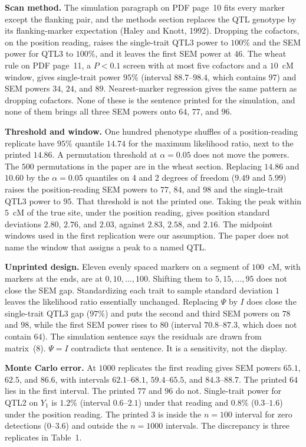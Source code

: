 \documentclass[11pt]{article}
\begin{document}
\textbf{Scan method.} The simulation paragraph on PDF page~10 fits every
marker except the flanking pair, and the methods section replaces the QTL
genotype by its flanking-marker expectation (Haley and Knott, 1992).
Dropping the cofactors, on the position reading, raises the single-trait QTL3
power to $100\%$ and the SEM power for QTL3 to $100\%$, and it leaves the
first SEM power at $46$. The wheat rule on PDF page~11, a $P<0.1$ screen
with at most five cofactors and a $10$~cM window, gives single-trait power
$95\%$ (interval $88.7$--$98.4$, which contains $97$) and SEM powers $34$,
$24$, and $89$. Nearest-marker regression gives the same pattern as dropping
cofactors. None of these is the sentence printed for the simulation, and
none of them brings all three SEM powers onto $64$, $77$, and $96$.

\textbf{Threshold and window.} One hundred phenotype shuffles of a position-reading
replicate have $95\%$ quantile $14.74$ for the maximum likelihood ratio,
next to the printed $14.86$. A permutation threshold at $\alpha=0.05$ does
not move the powers. The $500$ permutations in the paper are in the wheat
section. Replacing $14.86$ and $10.60$ by the $\alpha=0.05$ quantiles on 4
and 2 degrees of freedom ($9.49$ and $5.99$) raises the position-reading SEM
powers to $77$, $84$, and $98$ and the single-trait QTL3 power to $95$. That
threshold is not the printed one. Taking the peak within $5$~cM of the true
site, under the position reading, gives position standard deviations $2.80$,
$2.76$, and $2.03$, against $2.83$, $2.58$, and $2.16$. The midpoint windows
used in the first replication were our assumption. The paper does not name
the window that assigns a peak to a named QTL.

\textbf{Unprinted design.} Eleven evenly spaced markers on a segment of
$100$~cM, with markers at the ends, are at $0,10,\ldots,100$. Shifting them
to $5,15,\ldots,95$ does not close the SEM gap. Standardizing each trait to
sample standard deviation $1$ leaves the likelihood ratio essentially
unchanged. Replacing $\Psi$ by $I$ does close the single-trait QTL3 gap
($97\%$) and puts the second and third SEM powers on $78$ and $98$, while the
first SEM power rises to $80$ (interval $70.8$--$87.3$, which does not
contain $64$). The simulation sentence says the residuals are drawn from
matrix~(8). $\Psi=I$ contradicts that sentence. It is a sensitivity, not the
display.

\textbf{Monte Carlo error.} At $1000$ replicates the first reading gives SEM
powers $65.1$, $62.5$, and $86.6$, with intervals $62.1$--$68.1$,
$59.4$--$65.5$, and $84.3$--$88.7$. The printed $64$ lies in the first
interval. The printed $77$ and $96$ do not. Single-trait power for QTL2 on
$Y_1$ is $1.2\%$ (interval $0.6$--$2.1$) under that reading and $0.8\%$
($0.3$--$1.6$) under the position reading. The printed $3$ is inside the
$n=100$ interval for zero detections ($0$--$3.6$) and outside the
$n=1000$ intervals. The discrepancy is three replicates in Table~1.
\end{document}
